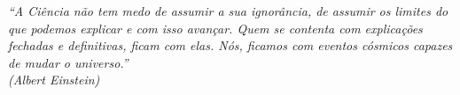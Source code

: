 \begin{epigrafe}
    \vspace*{\fill}
	\begin{flushright}
		\textit{``A Ciência não tem medo de assumir a sua ignorância, de assumir os limites do que podemos explicar e com isso avançar. Quem se contenta com explicações fechadas e definitivas, ficam com elas. Nós, ficamos com eventos cósmicos capazes de mudar o universo.'' \\
		(Albert Einstein)}
	\end{flushright}
\end{epigrafe}
